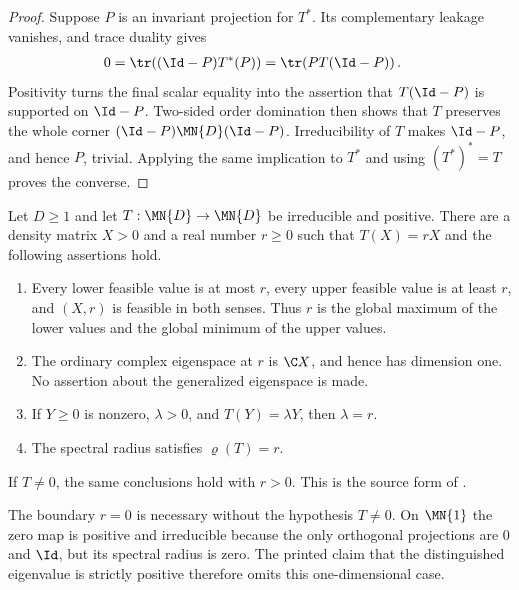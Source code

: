 \begin{proof}\leanok
    Suppose $P$ is an invariant projection for $T^*$. Its complementary
    leakage vanishes, and trace duality gives
    \begin{align}
        0
        &=\tr\!\left((\Id-P)T^*(P)\right)
         =\tr\!\left(P T(\Id-P)\right).
        \label{eq:qpf_trace_adjoint_leakage}
    \end{align}
    Positivity turns the final scalar equality into the assertion that
    $T(\Id-P)$ is supported on $\Id-P$. Two-sided order domination then
    shows that $T$ preserves the whole corner
    $(\Id-P)\MN{D}(\Id-P)$. Irreducibility of $T$ makes $\Id-P$, and hence
    $P$, trivial. Applying the same implication to $T^*$ and using
    $(T^*)^*=T$ proves the converse.
\end{proof}

\begin{theorem}
    \label{thm:wolf_irreducible_positive_spectral_radius}
    \leanok
    Let $D\geq1$ and let $T:\MN{D}\to\MN{D}$ be irreducible and positive.
    There are a density matrix $X>0$ and a real number $r\geq0$ such that
    $T(X)=rX$ and the following assertions hold.
    \begin{enumerate}
        \item Every lower feasible value is at most $r$, every upper feasible
              value is at least $r$, and $(X,r)$ is feasible in both senses.
              Thus $r$ is the global maximum of the lower values and the
              global minimum of the upper values.
        \item The ordinary complex eigenspace at $r$ is $\C X$, and hence has
              dimension one. No assertion about the generalized eigenspace is
              made.
        \item If $Y\geq0$ is nonzero, $\lambda>0$, and
              $T(Y)=\lambda Y$, then $\lambda=r$.
        \item The spectral radius satisfies $\varrho(T)=r$.
    \end{enumerate}
    If $T\neq0$, the same conclusions hold with $r>0$. This is the
    source form of \cite[Theorem~6.3]{Wolf2012Quantum}.

    The boundary $r=0$ is necessary without the hypothesis $T\neq0$.
    On $\MN{1}$ the zero map is positive and irreducible because the only
    orthogonal projections are $0$ and $\Id$, but its spectral radius is zero.
    The printed claim that the distinguished eigenvalue is strictly positive
    therefore omits this one-dimensional case.
\end{theorem}

